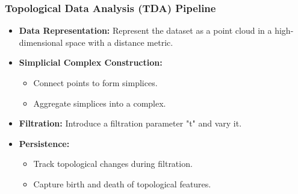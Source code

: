 \documentclass{beamer}
\begin{document}
\begin{frame}
  \frametitle{Topological Data Analysis (TDA) Pipeline}

  \begin{itemize}
    \setlength\itemsep{1em}
    \item \textbf{Data Representation:} Represent the dataset as a point cloud in a high-dimensional space with a distance metric.
    \item \textbf{Simplicial Complex Construction:}
      \begin{itemize}
        \setlength\itemsep{0.5em}
        \item Connect points to form simplices.
        \item Aggregate simplices into a complex.
      \end{itemize}
    \item \textbf{Filtration:} Introduce a filtration parameter "t" and vary it.
    \item \textbf{Persistence:}
      \begin{itemize}
        \setlength\itemsep{0.5em}
        \item Track topological changes during filtration.
        \item Capture birth and death of topological features.
      \end{itemize}
  \end{itemize}
\end{frame}
\end{document}
